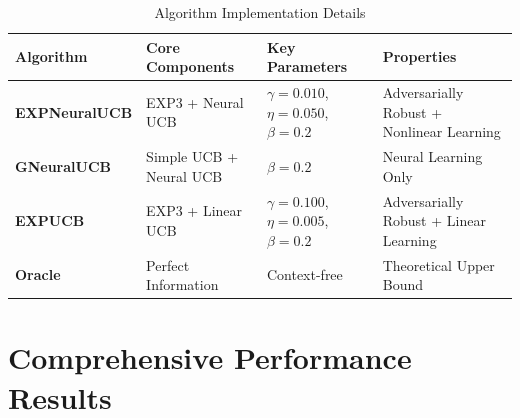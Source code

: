 \documentclass[11pt,a4paper]{article}
\begin{document}
\begin{table}[H]
\small
\centering
\caption{Algorithm Implementation Details}
\begin{tabular}{|l|p{4cm}|p{4.5cm}|p{5cm}|}
\hline
\textbf{Algorithm} & \textbf{Core Components} & \textbf{Key Parameters} & \textbf{Properties} \\
\hline
\hline
\textbf{EXPNeuralUCB} & EXP3 + Neural UCB & $\gamma=0.010$, $\eta=0.050$, $\beta=0.2$ & Adversarially Robust + Nonlinear Learning \\
\hline
\textbf{GNeuralUCB} & Simple UCB + Neural UCB & $\beta=0.2$ & Neural Learning Only \\
\hline
\textbf{EXPUCB} & EXP3 + Linear UCB & $\gamma=0.100$, $\eta=0.005$, $\beta=0.2$ & Adversarially Robust + Linear Learning \\
\hline
\textbf{Oracle} & Perfect Information & Context-free & Theoretical Upper Bound \\
\hline
\end{tabular}
\end{table}

\section{Comprehensive Performance Results}
\end{document}
